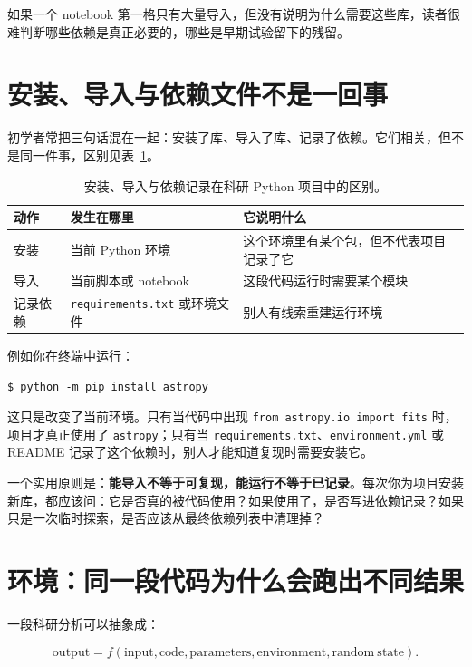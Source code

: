 如果一个 notebook 第一格只有大量导入，但没有说明为什么需要这些库，读者很难判断哪些依赖是真正必要的，哪些是早期试验留下的残留。

\section{安装、导入与依赖文件不是一回事}

初学者常把三句话混在一起：安装了库、导入了库、记录了依赖。它们相关，但不是同一件事，区别见表~\ref{tab:ch04_install_import_dependency}。

\begin{table}[htbp]
\centering
\begin{tabular}{p{}p{}p{}}
\toprule
动作 & 发生在哪里 & 它说明什么 \\
\midrule
安装 & 当前 Python 环境 & 这个环境里有某个包，但不代表项目记录了它 \\
导入 & 当前脚本或 notebook & 这段代码运行时需要某个模块 \\
记录依赖 & \texttt{requirements.txt} 或环境文件 & 别人有线索重建运行环境 \\
\bottomrule
\end{tabular}
\caption{安装、导入与依赖记录在科研 Python 项目中的区别。}
\label{tab:ch04_install_import_dependency}
\end{table}

例如你在终端中运行：

\begin{lstlisting}[style=terminal]
$ python -m pip install astropy
\end{lstlisting}

这只是改变了当前环境。只有当代码中出现 \texttt{from astropy.io import fits} 时，项目才真正使用了 \texttt{astropy}；只有当 \texttt{requirements.txt}、\texttt{environment.yml} 或 README 记录了这个依赖时，别人才能知道复现时需要安装它。

一个实用原则是：\textbf{能导入不等于可复现，能运行不等于已记录}。每次你为项目安装新库，都应该问：它是否真的被代码使用？如果使用了，是否写进依赖记录？如果只是一次临时探索，是否应该从最终依赖列表中清理掉？

\section{环境：同一段代码为什么会跑出不同结果}

一段科研分析可以抽象成：

\[
\mathrm{output}=f(\mathrm{input}, \mathrm{code}, \mathrm{parameters}, \mathrm{environment}, \mathrm{random\ state}).
\]

